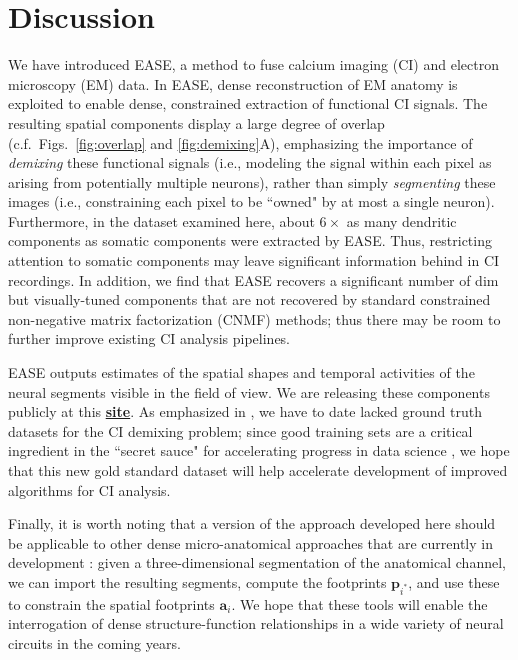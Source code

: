 \documentclass[10pt,letterpaper]{article}
\def \resultURL{https://github.com/zhoupc/ease_project/tree/master/data_sharing}
\begin{document}
\clearpage

\section{Discussion}

We have introduced EASE, a method to fuse calcium imaging (CI) and electron microscopy (EM) data.  In EASE,
dense reconstruction of EM anatomy is exploited to enable dense, constrained extraction of functional CI signals.  The resulting spatial components display a large degree of overlap (c.f.~Figs.~\ref{fig:overlap} and \ref{fig:demixing}A), emphasizing the importance of \emph{demixing} these functional signals (i.e., modeling the signal within each pixel as arising from potentially multiple neurons), rather than simply \emph{segmenting} these images (i.e., constraining each pixel to be ``owned" by at most a single neuron).  Furthermore, in the dataset examined here, about $6 \times$ as many dendritic components as somatic components were extracted by EASE.  Thus, restricting attention to somatic components may leave significant information behind in CI recordings.  In addition, we find that EASE recovers a significant number of dim but visually-tuned components that are not recovered by standard constrained non-negative matrix factorization (CNMF) methods; thus there may be room to further improve existing CI analysis pipelines.

EASE outputs estimates of the spatial shapes and temporal activities of the neural segments visible in the field of view.  We are releasing these components publicly at this  \href{\resultURL}{\bf site}.  
As emphasized in \citep{Paninski2018, Soltanian2019}, we have to date lacked ground truth datasets for the CI demixing problem; since good training sets are a critical ingredient in the ``secret sauce" for accelerating progress in data science \citep{Donoho2017}, we hope that this new gold standard dataset will help accelerate development of improved algorithms for CI analysis.

Finally, it is worth noting that a version of the approach developed here should be applicable to other dense micro-anatomical approaches that are currently in development \citep{Alon2018, Gao2019}: given a three-dimensional segmentation of the anatomical channel, we can import the resulting segments, compute the footprints $\bm{p}_{i^*}$, and use these to constrain the spatial footprints $\bm{a}_i$.  We hope that these tools will enable the interrogation of dense structure-function relationships in a wide variety of neural circuits in the coming years.
\end{document}
